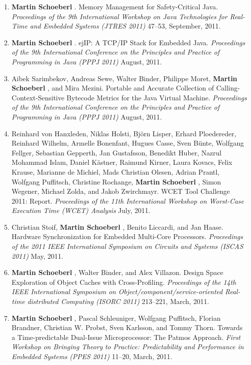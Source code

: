 \begin{enumerate}
\item {\bf Martin Schoeberl }.
 Memory Management for Safety-Critical Java.
 \emph{Proceedings of the 9th International Workshop on Java Technologies for Real-Time and Embedded Systems (JTRES 2011)} 47--53, September, 2011.

\item {\bf Martin Schoeberl }.
 ejIP: A TCP/IP Stack for Embedded Java.
 \emph{Proceedings of the 9th International Conference on the Principles and Practice of Programming in Java (PPPJ 2011)} August, 2011.

\item Aibek Sarimbekov, Andreas Sewe, Walter Binder, Philippe Moret, {\bf Martin Schoeberl }, and Mira Mezini.
 Portable and Accurate Collection of Calling-Context-Sensitive Bytecode Metrics for the Java Virtual Machine.
 \emph{Proceedings of the 9th International Conference on the Principles and Practice of Programming in Java (PPPJ 2011)} August, 2011.

\item Reinhard von Hanxleden, Niklas Holsti, Bj{\"o}rn Lisper, Erhard Ploedereder, Reinhard Wilhelm, Armelle Bonenfant, Hugues Casse, Sven B{\"u}nte, Wolfgang Fellger, Sebastian Gepperth, Jan Gustafsson, Benedikt Huber, Nazrul Mohammad Islam, Daniel K{\"a}stner, Raimund Kirner, Laura Kovacs, Felix Krause, Marianne de Michiel, Mads Christian Olesen, Adrian Prantl, Wolfgang Puffitsch, Christine Rochange, {\bf Martin Schoeberl }, Simon Wegener, Michael Zolda, and Jakob Zwirchmayr.
 WCET Tool Challenge 2011: Report.
 \emph{Proceedings of the 11th International Workshop on Worst-Case Execution Time (WCET) Analysis} July, 2011.

\item Christian Stoif, {\bf Martin Schoeberl }, Benito Liccardi, and Jan Haase.
 Hardware Synchronization for Embedded Multi-Core Processors.
 \emph{Proceedings of the 2011 IEEE International Symposium on Circuits and Systems (ISCAS 2011)} May, 2011.

\item {\bf Martin Schoeberl }, Walter Binder, and Alex Villazon.
 Design Space Exploration of Object Caches with Cross-Profiling.
 \emph{Proceedings of the 14th IEEE International Symposium on Object/component/service-oriented Real-time distributed Computing (ISORC 2011)} 213--221, March, 2011.

\item {\bf Martin Schoeberl }, Pascal Schleuniger, Wolfgang Puffitsch, Florian Brandner, Christian W. Probst, Sven Karlsson, and Tommy Thorn.
 Towards a Time-predictable Dual-Issue Microprocessor: The Patmos Approach.
 \emph{First Workshop on Bringing Theory to Practice: Predictability and Performance in Embedded Systems (PPES 2011)} 11--20, March, 2011.


\end{enumerate}
